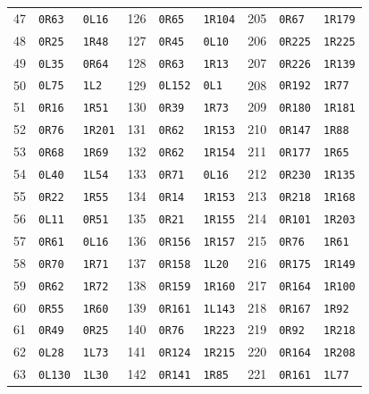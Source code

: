 \begin{longtable}{rll@{\qquad}rll@{\qquad}rll}
47 & \texttt{0R63} & \texttt{0L16} & 126 & \texttt{0R65} & \texttt{1R104} & 205 & \texttt{0R67} & \texttt{1R179}\\
48 & \texttt{0R25} & \texttt{1R48} & 127 & \texttt{0R45} & \texttt{0L10} & 206 & \texttt{0R225} & \texttt{1R225}\\
49 & \texttt{0L35} & \texttt{0R64} & 128 & \texttt{0R63} & \texttt{1R13} & 207 & \texttt{0R226} & \texttt{1R139}\\
50 & \texttt{0L75} & \texttt{1L2} & 129 & \texttt{0L152} & \texttt{0L1} & 208 & \texttt{0R192} & \texttt{1R77}\\
51 & \texttt{0R16} & \texttt{1R51} & 130 & \texttt{0R39} & \texttt{1R73} & 209 & \texttt{0R180} & \texttt{1R181}\\
52 & \texttt{0R76} & \texttt{1R201} & 131 & \texttt{0R62} & \texttt{1R153} & 210 & \texttt{0R147} & \texttt{1R88}\\
53 & \texttt{0R68} & \texttt{1R69} & 132 & \texttt{0R62} & \texttt{1R154} & 211 & \texttt{0R177} & \texttt{1R65}\\
54 & \texttt{0L40} & \texttt{1L54} & 133 & \texttt{0R71} & \texttt{0L16} & 212 & \texttt{0R230} & \texttt{1R135}\\
55 & \texttt{0R22} & \texttt{1R55} & 134 & \texttt{0R14} & \texttt{1R153} & 213 & \texttt{0R218} & \texttt{1R168}\\
56 & \texttt{0L11} & \texttt{0R51} & 135 & \texttt{0R21} & \texttt{1R155} & 214 & \texttt{0R101} & \texttt{1R203}\\
57 & \texttt{0R61} & \texttt{0L16} & 136 & \texttt{0R156} & \texttt{1R157} & 215 & \texttt{0R76} & \texttt{1R61}\\
58 & \texttt{0R70} & \texttt{1R71} & 137 & \texttt{0R158} & \texttt{1L20} & 216 & \texttt{0R175} & \texttt{1R149}\\
59 & \texttt{0R62} & \texttt{1R72} & 138 & \texttt{0R159} & \texttt{1R160} & 217 & \texttt{0R164} & \texttt{1R100}\\
60 & \texttt{0R55} & \texttt{1R60} & 139 & \texttt{0R161} & \texttt{1L143} & 218 & \texttt{0R167} & \texttt{1R92}\\
61 & \texttt{0R49} & \texttt{0R25} & 140 & \texttt{0R76} & \texttt{1R223} & 219 & \texttt{0R92} & \texttt{1R218}\\
62 & \texttt{0L28} & \texttt{1L73} & 141 & \texttt{0R124} & \texttt{1R215} & 220 & \texttt{0R164} & \texttt{1R208}\\
63 & \texttt{0L130} & \texttt{1L30} & 142 & \texttt{0R141} & \texttt{1R85} & 221 & \texttt{0R161} & \texttt{1L77}\\

\end{longtable}
